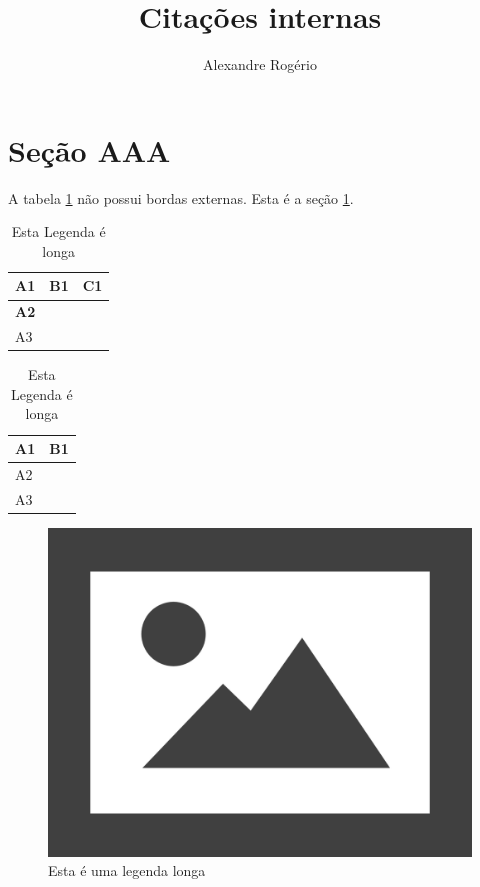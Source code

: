 \documentclass{article}
\begin{document}
	
	\title{\textbf{{\Huge Citações internas}}}
	\author{Alexandre Rogério}
	\date{}
	\maketitle
	\thispagestyle{empty}
	\newpage
	
	\setcounter{page}{1}
	\tableofcontents
	\newpage
	
	\listoffigures
	\newpage
	
	\listoftables
	\newpage

	\setcounter{page}{1}
	
	\section{Seção AAA}
	\label{sec:secAAA}
	A tabela \ref{tab:tab_sem_borda} não possui bordas externas. Esta é a seção \ref{sec:secAAA}.

	\begin{table}[H]
		\centering
		\caption[Legenda Curta]{Esta Legenda é longa}
		\label{tab:tab_sem_borda}
		\begin{tabular}{l|l|l}
			{\LARGE \textbf{A1}} & \textbf{B1} & \textbf{C1} \\ \hline
			\textbf{A2}          &             &             \\ \hline
			A3          &             &             \\
		\end{tabular}
	\end{table}

	\renewcommand{\arraystretch}{1.5}
	\begin{table}[H]
		\centering
		\caption[Legenda Curta]{Esta Legenda é longa}
		\label{tab:tab_com_borda}
		\begin{tabular}{|l|l|l|}
			\hline
			\textbf{A1} & \multicolumn{2}{l|}{\textbf{B1}} \\ \hline
			A2          &                 &                \\ \hline
			A3          &                 &                \\ \hline
		\end{tabular}
	\end{table}
	
	\begin{figure}[H]
		\centering
		\includegraphics[width=0.5\linewidth]{Figuras/fig1}
		\caption[Legenda curta]{Esta é uma legenda longa}
		\label{fig:fig1}
	\end{figure}
	
\end{document}
